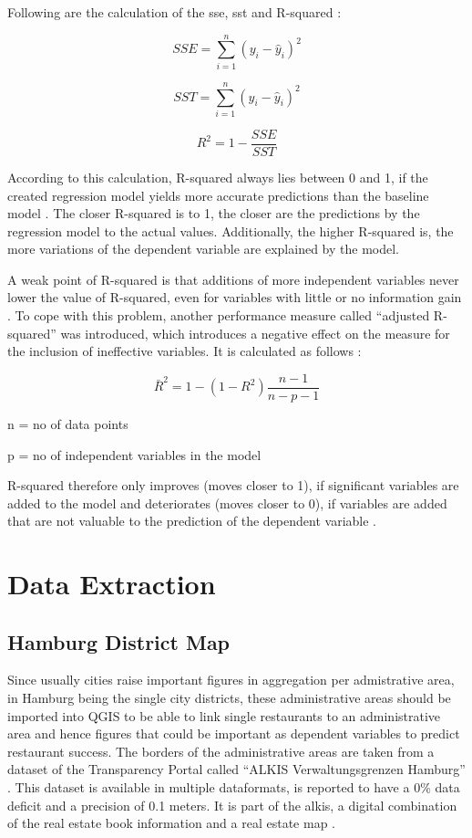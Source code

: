 \documentclass[a4paper, 11pt, oneside]{Thesis}  %
\begin{document}
Following are the calculation of the \ac{sse}, \ac{sst} and R-squared \cite{Devasthali.2018}:

\[SSE = \sum\limits_{i=1}^n (y_{i} - \hat{y}_{i})^2\]

\[SST = \sum\limits_{i=1}^n (y_{i} - \hat{y}_{i})^2\]

\[ R^2 = 1 - \frac{SSE}{SST}\]

According to this calculation, R-squared always lies between 0 and 1, if the created regression model yields more accurate predictions than the baseline model \cite{Devasthali.2018}. The closer R-squared is to 1, the closer are the predictions by the regression model to the actual values. Additionally, the higher R-squared is, the more variations of the dependent variable are explained by the model.

A weak point of R-squared is that additions of more independent variables never lower the value of R-squared, even for variables with little or no information gain \cite{Devasthali.2018}. To cope with this problem, another performance measure called ``adjusted R-squared'' was introduced, which introduces a negative effect on the measure for the inclusion of ineffective variables. It is calculated as follows \cite{Devasthali.2018}:

\[ \bar{R}^2 = 1 - (1-R^2)\frac{n-1}{n-p-1}\]

n = no of data points

p = no of independent variables in the model

R-squared therefore only improves (moves closer to 1), if significant variables are added to the model and deteriorates (moves closer to 0), if variables are added that are not valuable to the prediction of the dependent variable \cite{Devasthali.2018}. 

\chapter{Data Extraction}

\section{Hamburg District Map}

Since usually cities raise important figures in aggregation per admistrative area, in Hamburg being the single city districts, these administrative areas should be imported into QGIS to be able to link single restaurants to an administrative area and hence figures that could be important as dependent variables to predict restaurant success. The borders of the administrative areas are taken from a dataset of the Transparency Portal called ``ALKIS Verwaltungsgrenzen Hamburg'' \cite{LandesbetriebGeoinformationundVermessung.28.02.2018}. This dataset is available in multiple dataformats, is reported to have a 0\% data deficit and a precision of 0.1 meters. It is part of the \ac{alkis}, a digital combination of the real estate book information and a real estate map \cite{ALKIS2019}.
\end{document}

